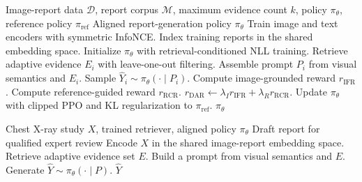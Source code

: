 \begin{algorithm}[t]
\caption{Dual-Anchor Reward-Aware PPO Training}
\label{alg:dual_anchor_rappo}
\begin{algorithmic}[1]
\Require Image-report data $\mathcal{D}$, report corpus $\mathcal{M}$,
maximum evidence count $k$, policy $\pi_\theta$, reference policy
$\pi_{\mathrm{ref}}$
\Ensure Aligned report-generation policy $\pi_\theta$
\State Train image and text encoders with symmetric InfoNCE.
\State Index training reports in the shared embedding space.
\State Initialize $\pi_\theta$ with retrieval-conditioned NLL training.
  \State Retrieve adaptive evidence $E_i$ with leave-one-out filtering.
  \State Assemble prompt $P_i$ from visual semantics and $E_i$.
  \State Sample $\hat{Y}_i \sim \pi_\theta(\cdot \mid P_i)$.
  \State Compute image-grounded reward $r_{\mathrm{IFR}}$.
  \State Compute reference-guided reward $r_{\mathrm{RCR}}$.
  \State $r_{\mathrm{DAR}} \gets
  \lambda_I r_{\mathrm{IFR}} + \lambda_R r_{\mathrm{RCR}}$.
  \State Update $\pi_\theta$ with clipped PPO and KL regularization to
  $\pi_{\mathrm{ref}}$.
\EndFor
\State \Return $\pi_\theta$
\end{algorithmic}
\end{algorithm}

\begin{algorithm}[t]
\caption{Dual-Anchor RAPPO Inference}
\label{alg:dual_anchor_inference}
\begin{algorithmic}[1]
\Require Chest X-ray study $X$, trained retriever, aligned policy $\pi_\theta$
\Ensure Draft report for qualified expert review
\State Encode $X$ in the shared image-report embedding space.
\State Retrieve adaptive evidence set $E$.
\State Build a prompt from visual semantics and $E$.
\State Generate $\hat{Y} \sim \pi_\theta(\cdot \mid P)$.
\State \Return $\hat{Y}$
\end{algorithmic}
\end{algorithm}

